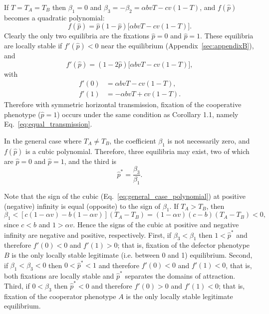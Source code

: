 \documentclass[12pt]{extarticle}
\begin{document}
{If $T=T_A=T_B$ then $\beta_1=0$ and $\beta_3=-\beta_2=\alpha b vT -cv(1-T)$, 
and $f(\hat{p})$ becomes a quadratic polynomial:
\begin{equation} \label{eq:equal_horizontal_transmission}
  f(\hat{p}) = \hat{p}(1-\hat{p})\big[\alpha bvT - cv(1-T)\big].
\end{equation}
Clearly the only two equilibria are the fixations  $\hat{p} =  0$ and $\hat{p} = 1$.
These equilibria are locally stable if $f'(\hat{p})<0$ near the equilibrium (Appendix~\autoref{sec:appendixB}), and
\begin{equation}
f'(\hat{p})=(1-2\hat{p})\big[\alpha bvT - cv(1-T)\big],
\end{equation}
with
\begin{equation} \label{eq:derivative_of_phattag-phat}
\begin{aligned}
	f'(0) &=	\alpha bvT - cv(1-T), \\
	f'(1) &=	-\alpha bvT + cv(1-T).
\end{aligned}
\end{equation}
Therefore with symmetric horizontal transmission, fixation of the cooperative phenotype ($\hat{p}=1$) occurs under the same condition as Corollary 1.1, namely Eq.\ \ref{eq:equal_transmission}.


In the general case where $T_A \neq T_B$, the coefficient $\beta_1$ is not necessarily zero, and $f(\hat{p})$ is a cubic polynomial.
Therefore, three equilibria may exist, two of which are
$\hat{p} = 0 $ and $\hat{p} = 1$, and the third is
\begin{equation} \label{eq:oblique_and_vertic_result}
  \hat{p}^* =  
  \frac{\beta_3}{\beta_1}.
\end{equation}

Note that the sign of the  cubic (Eq.\ \ref{eq:general_case_polynomial}) at positive (negative) infinity is equal (opposite) to the sign of $\beta_1$. 
If $T_A>T_B$, then 
\begin{equation} \label{eq:beta1}
   \beta_1 < [c(1-\alpha v) - b(1-\alpha v)] (T_A-T_B) 
   = (1-\alpha v)(c-b)(T_A-T_B) < 0 ,
 \end{equation}
since $c<b$ and $1>\alpha v$. Hence the signs of the cubic at positive and negative infinity are negative and positive, respectively.
First, if $\beta_3<\beta_1$ then 
$1<\hat{p}^*$ and therefore $f'(0)<0$ and $f'(1)>0$; that is, fixation of the defector phenotype $B$ is the only locally stable legitimate (i.e. between 0 and 1) equilibrium.
Second, if $\beta_1<\beta_3<0$ then 
$0<\hat{p}^*<1$ and therefore $f'(0)<0$ and $f'(1)<0$, that is, both fixations are locally stable and $\hat{p}^*$ separates the domains of attraction.
Third, if $0<\beta_3$ then 
$\hat{p}^*<0$ and therefore $f'(0)>0$ and $f'(1)<0$; that is, fixation of the cooperator phenotype $A$ is the only locally stable legitimate equilibrium.

}
\end{document}
